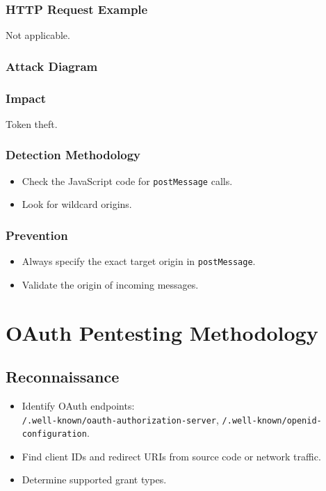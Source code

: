 \documentclass[12pt,a4paper]{article}
\begin{document}
\subsubsection{HTTP Request Example}
Not applicable.

\subsubsection{Attack Diagram}


\subsubsection{Impact}
Token theft.

\subsubsection{Detection Methodology}
\begin{itemize}
    \item Check the JavaScript code for \texttt{postMessage} calls.
    \item Look for wildcard origins.
\end{itemize}


\subsubsection{Prevention}
\begin{itemize}
    \item Always specify the exact target origin in \texttt{postMessage}.
    \item Validate the origin of incoming messages.
\end{itemize}


\section{OAuth Pentesting Methodology}
\subsection{Reconnaissance}
\begin{itemize}
    \item Identify OAuth endpoints:\\ \texttt{/.well-known/oauth-authorization-server}, \texttt{/.well-known/openid-configuration}.
    \item Find client IDs and redirect URIs from source code or network traffic.
    \item Determine supported grant types.
\end{itemize}
\end{document}
